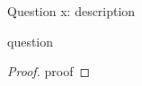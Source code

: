 \begin{solution}{Question x: description}\label{ques:x}
    \begin{question}
    question
    \end{question}
    \tcblower{}
    \begin{proof}
    proof
    \end{proof}
\end{solution}
